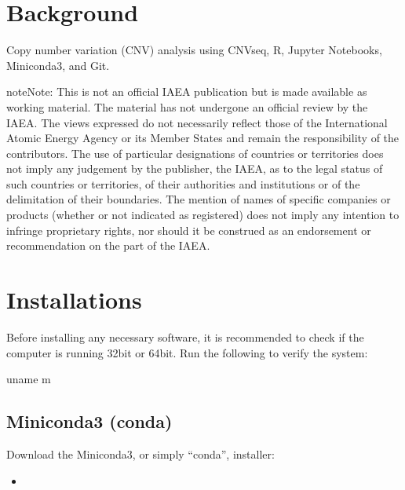 \documentclass[letterpaper,10pt,english]{sphinxhowto}
\begin{document}
\pagestyle{plain}
\sphinxtableofcontents
\pagestyle{normal}
\label{\detokenize{index::doc}}



\section{Background}
\label{\detokenize{index:background}}
\sphinxstylestrong{{[}DRAFT{]}}

Copy number variation (CNV) analysis using CNV\sphinxhyphen{}seq, R, Jupyter Notebooks, Miniconda3, and Git.

\begin{sphinxadmonition}{note}{Note:}
This is not an official IAEA publication but is made available as working material. The material has not undergone an official review by the IAEA. The views expressed do not necessarily reflect those of the International Atomic Energy Agency or its Member States and remain the responsibility of the contributors. The use of particular designations of countries or territories does not imply any judgement by the publisher, the IAEA, as to the legal status of such countries or territories, of their authorities and institutions or of the delimitation of their boundaries. The mention of names of specific companies or products (whether or not indicated as registered) does not imply any intention to infringe proprietary rights, nor should it be construed as an endorsement or recommendation on the part of the IAEA.
\end{sphinxadmonition}


\section{Installations}
\label{\detokenize{index:installations}}
Before installing any necessary software, it is recommended to check if the computer is running 32\sphinxhyphen{}bit or 64\sphinxhyphen{}bit. Run the following to verify the system:

\begin{sphinxVerbatim}[commandchars=\\\{\}]
\PYGZdl{} uname \PYGZhy{}m
\end{sphinxVerbatim}


\subsection{Miniconda3 (conda)}
\label{\detokenize{index:miniconda3-conda}}
Download the Miniconda3, or simply “conda”, installer:
\begin{itemize}
\item {} 

\end{itemize}
\end{document}
